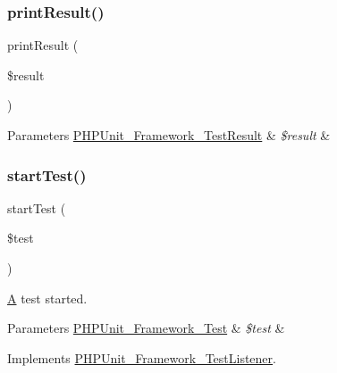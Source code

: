 \subsubsection{\texorpdfstring{print\+Result()}{printResult()}}
{\footnotesize\ttfamily print\+Result (\begin{DoxyParamCaption}\item[{\mbox{\hyperlink{class_p_h_p_unit___framework___test_result}{P\+H\+P\+Unit\+\_\+\+Framework\+\_\+\+Test\+Result}}}]{\$result }\end{DoxyParamCaption})}


\begin{DoxyParams}[1]{Parameters}
\mbox{\hyperlink{class_p_h_p_unit___framework___test_result}{P\+H\+P\+Unit\+\_\+\+Framework\+\_\+\+Test\+Result}} & {\em \$result} & \\
\hline
\end{DoxyParams}
\mbox{\label{class_p_h_p_unit___util___log___team_city_a1a9bddc54f26bb3fb5c2ec9778ea5198}} 
\subsubsection{\texorpdfstring{start\+Test()}{startTest()}}
{\footnotesize\ttfamily start\+Test (\begin{DoxyParamCaption}\item[{\mbox{\hyperlink{interface_p_h_p_unit___framework___test}{P\+H\+P\+Unit\+\_\+\+Framework\+\_\+\+Test}}}]{\$test }\end{DoxyParamCaption})}

\mbox{\hyperlink{class_a}{A}} test started.


\begin{DoxyParams}[1]{Parameters}
\mbox{\hyperlink{interface_p_h_p_unit___framework___test}{P\+H\+P\+Unit\+\_\+\+Framework\+\_\+\+Test}} & {\em \$test} & \\
\hline
\end{DoxyParams}


Implements \mbox{\hyperlink{interface_p_h_p_unit___framework___test_listener_a1a9bddc54f26bb3fb5c2ec9778ea5198}{P\+H\+P\+Unit\+\_\+\+Framework\+\_\+\+Test\+Listener}}.

